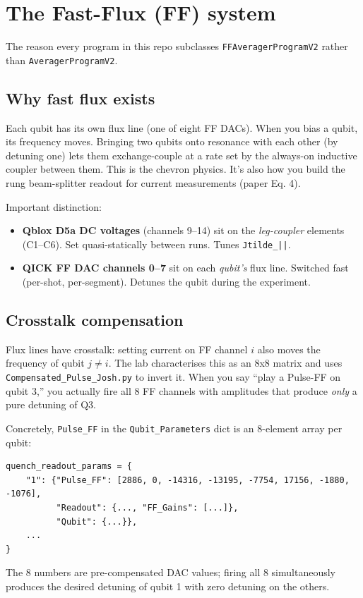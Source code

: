 \documentclass[11pt,letterpaper]{article}
\begin{document}
\section{The Fast-Flux (FF) system}
The reason every program in this repo subclasses \texttt{FFAveragerProgramV2} rather than \texttt{AveragerProgramV2}.

\subsection{Why fast flux exists}
Each qubit has its own flux line (one of eight FF DACs). When you bias a qubit, its frequency moves. Bringing two qubits onto resonance with each other (by detuning one) lets them exchange-couple at a rate set by the always-on inductive coupler between them. This is the chevron physics. It's also how you build the rung beam-splitter readout for current measurements (paper Eq. 4).

Important distinction:
\begin{itemize}[leftmargin=*]
  \item \textbf{Qblox D5a DC voltages} (channels 9--14) sit on the \emph{leg-coupler} elements (C1--C6). Set quasi-statically between runs. Tunes \texttt{Jtilde\_||}.
  \item \textbf{QICK FF DAC channels 0--7} sit on each \emph{qubit's} flux line. Switched fast (per-shot, per-segment). Detunes the qubit during the experiment.
\end{itemize}

\subsection{Crosstalk compensation}
Flux lines have crosstalk: setting current on FF channel \(i\) also moves the frequency of qubit \(j\ne i\). The lab characterises this as an 8x8 matrix and uses \texttt{Compensated\_Pulse\_Josh.py} to invert it. When you say ``play a Pulse-FF on qubit 3,'' you actually fire all 8 FF channels with amplitudes that produce \emph{only} a pure detuning of Q3.

Concretely, \texttt{Pulse\_FF} in the \texttt{Qubit\_Parameters} dict is an 8-element array per qubit:
\begin{lstlisting}
quench_readout_params = {
    "1": {"Pulse_FF": [2886, 0, -14316, -13195, -7754, 17156, -1880, -1076],
          "Readout": {..., "FF_Gains": [...]},
          "Qubit": {...}},
    ...
}
\end{lstlisting}
The 8 numbers are pre-compensated DAC values; firing all 8 simultaneously produces the desired detuning of qubit 1 with zero detuning on the others.
\end{document}
